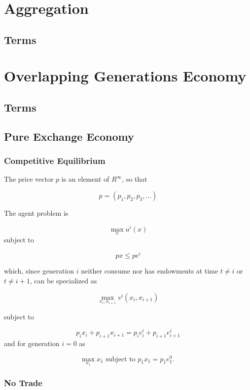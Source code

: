 \documentclass[10pt]{article}
\begin{document}
\section{Aggregation}

\subsection{Terms}



\section{Overlapping Generations Economy}

\subsection{Terms}



\subsection{Pure Exchange Economy}

\subsubsection{Competitive Equilibrium}

The price vector $p$ is an element of $R^{\infty}$, so that

$$
p=\left(p_1, p_2, p_3, \ldots\right)
$$

The agent problem is

$$
\max _x u^i(x)
$$
subject to

$$
p x \leq p e^i
$$

which, since generation $i$ neither consume nor has endowments at time $t \neq i$ or $t \neq i+1$, can be specialized as

$$
\max _{x_i, x_{i+1}} v^i\left(x_i, x_{i+1}\right)
$$

subject to

$$
p_i x_i+p_{i+1} x_{i+1}=p_i e_i^i+p_{i+1} e_{i+1}^i
$$
and for generation $i=0$ as

$$
\max _{x_1} x_1 \text { subject to } p_1 x_1=p_1 e_1^0 \text {. }
$$

\subsubsection{No Trade}
\end{document}
